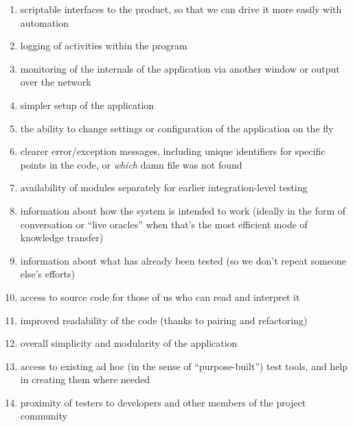 \documentclass{report}
\begin{document}
\begin{enumerate}

  \item scriptable interfaces to the product, so that we can drive it
  more easily with automation

  \item logging of activities within the program

  \item monitoring of the internals of the application via another
  window or output over the network

  \item simpler setup of the application

  \item the ability to change settings or configuration of the
  application on the fly

  \item clearer error/exception messages, including unique identifiers
  for specific points in the code, or \emph{which} damn file was not
  found

  \item availability of modules separately for earlier
  integration-level testing

  \item information about how the system is intended to work (ideally
  in the form of conversation or ``live oracles'' when that's the most
  efficient mode of knowledge transfer)

  \item information about what has already been tested (so we don't
  repeat someone else's efforts)

  \item access to source code for those of us who can read and
  interpret it

  \item improved readability of the code (thanks to pairing and
  refactoring)

  \item overall simplicity and modularity of the application

  \item access to existing ad hoc (in the sense of ``purpose-built'')
  test tools, and help in creating them where needed

  \item proximity of testers to developers and other members of the
  project community

\end{enumerate}
\end{document}
